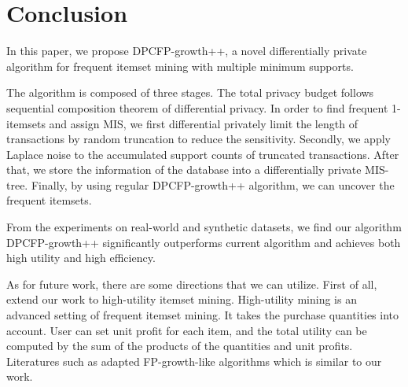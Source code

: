 \documentclass[conference]{IEEEtran}
\begin{document}




\section{Conclusion}\label{sec6}
In this paper, we propose DPCFP-growth++, a novel differentially private algorithm for frequent itemset mining with multiple minimum supports. 

The algorithm is composed of three stages. 
The total privacy budget follows sequential composition theorem of differential privacy.
In order to find frequent 1-itemsets and assign MIS, we first differential privately limit the length of transactions by random truncation to reduce the sensitivity. 
Secondly, we apply Laplace noise to the accumulated support counts of truncated transactions.
After that, we store the information of the database into a differentially private MIS-tree.
Finally, by using regular DPCFP-growth++ algorithm, we can uncover the frequent itemsets.

From the experiments on real-world and synthetic datasets, 
we find our algorithm DPCFP-growth++ significantly outperforms current algorithm and achieves both high utility and high efficiency. 

As for future work, there are some directions that we can utilize. 
First of all, extend our work to high-utility itemset mining. 
High-utility mining is an advanced setting of frequent itemset mining. 
It takes the purchase quantities into account. 
User can set unit profit for each item, and the total utility can be computed by the sum of the products of the quantities and unit profits.
Literatures such as \cite{b22} adapted FP-growth-like algorithms which is similar to our work.
\end{document}
